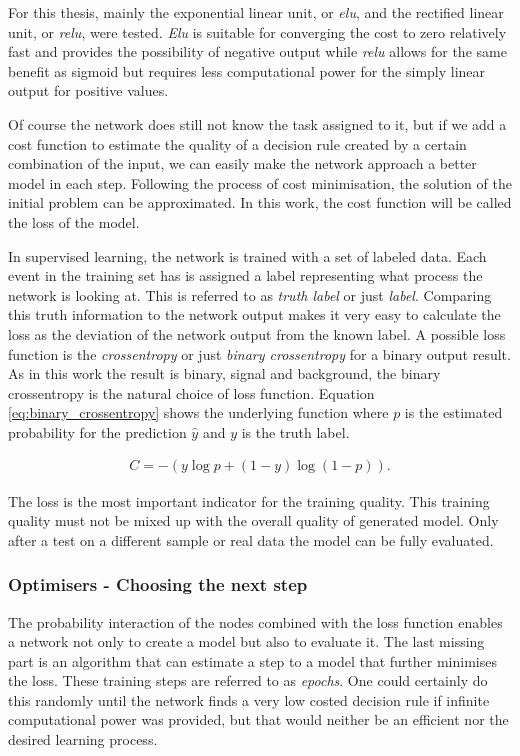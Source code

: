 For this thesis, mainly the exponential linear unit, or \textit{elu}, and the rectified linear unit, or \textit{relu}, were tested.
\textit{Elu} is suitable for converging the cost to zero relatively fast and provides the possibility of negative output while \textit{relu} allows for the same benefit as sigmoid but  requires less computational power for the simply linear output for positive values.

Of course the network does still not know the task assigned to it, but if we add a cost function to estimate the quality of a decision rule created by a certain combination of the input, we can easily make the network approach a better model in each step. Following the process of cost minimisation, the solution of the initial problem can be approximated.
In this work, the cost function will be called the loss of the model.

In supervised learning, the network is trained with a set of labeled data. Each event in the training set has is assigned a label representing what process the network is looking at. This is referred to as \emph{truth label} or just \emph{label}. Comparing this truth information to the network output makes it very easy to calculate the loss as the deviation of the network output from the known label. A possible loss function is the \emph{crossentropy} or just \emph{binary crossentropy} for a binary output result. As in this work the result is binary, signal and background, the binary crossentropy is the natural choice of loss function. Equation \eqref{eq:binary_crossentropy} shows the underlying function where $p$ is the estimated probability for the prediction $\hat{y}$ and $y$ is the truth label.

\begin{align}
    C = -(y \log p + (1 - y) \log (1 - p) ).
    \label{eq:binary_crossentropy}
\end{align}

The loss is the most important indicator for the training quality. This training quality must not be mixed up with the overall quality of generated model. Only after a test on a different sample or real data the model can be fully evaluated.

\subsubsection{Optimisers - Choosing the next step}
\label{sec:optimisation}

The probability interaction of the nodes combined with the loss function enables a network not only to create a model but also to evaluate it. The last missing part is an algorithm that can estimate a step to a model that further minimises the loss. These training steps are referred to as \emph{epochs}. One could certainly do this randomly until the network finds a very low costed decision rule if infinite computational power was provided, but that would neither be an efficient nor the desired learning process.

